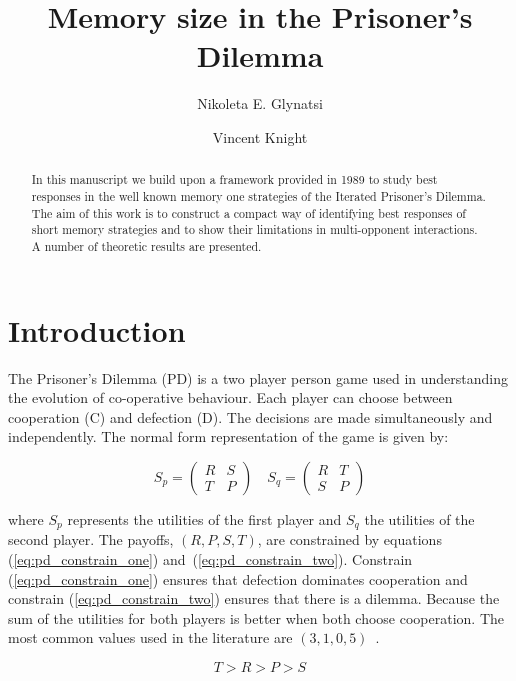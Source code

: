 \documentclass[10pt]{article}
\title{Memory size in the Prisoner's Dilemma}
\author{Nikoleta E. Glynatsi \and Vincent Knight}
\date{}
\begin{document}
\maketitle

\begin{abstract}

In this manuscript we build upon a framework provided in 1989 to study best
responses in the well known memory one strategies of the Iterated Prisoner's
Dilemma. The aim of this work is to construct a compact way of identifying best
responses of short memory strategies and to show their limitations in multi-opponent
interactions. A number of theoretic results are presented. %
\end{abstract}

\section{Introduction}\label{section:introduction}

The Prisoner's Dilemma (PD) is a two player person game used in understanding the
evolution of co-operative behaviour. Each player can choose between cooperation
(C) and defection (D). The decisions are made simultaneously and independently.
The normal form representation of the game is given by:

\begin{equation}\label{equ:pd_definition}
    S_p = \begin{pmatrix}
    R & S  \\
    T & P
    \end{pmatrix} \quad
    S_q = \begin{pmatrix}
        R & T  \\
        S & P
        \end{pmatrix}
\end{equation}

where \(S_p\) represents the utilities of the first player and \(S_q\) the utilities
of the second player. The payoffs, \((R, P, S, T)\), are constrained by equations
(\ref{eq:pd_constrain_one}) and~(\ref{eq:pd_constrain_two}). Constrain
(\ref{eq:pd_constrain_one}) ensures that defection dominates cooperation and
constrain (\ref{eq:pd_constrain_two}) ensures that there is a dilemma. Because
the sum of the utilities for both players is better when both choose cooperation.
The most common values used in the literature are \((3, 1, 0, 5)\)~\cite{Axelrod1981}.

\begin{equation}\label{eq:pd_constrain_one}
    T > R > P > S 
\end{equation}
\end{document}
